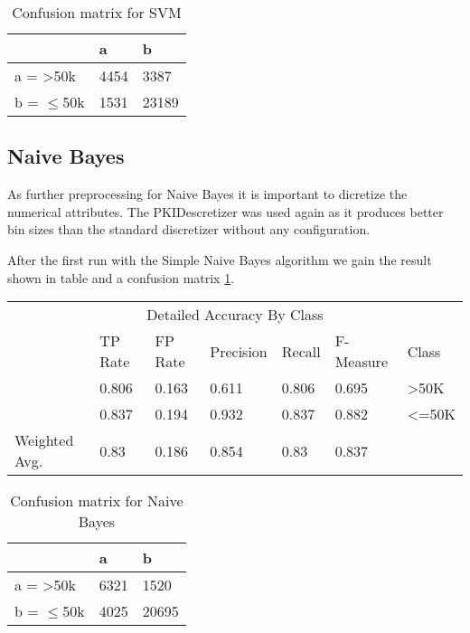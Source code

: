 \documentclass[paper=a4, fontsize=11pt]{scrartcl} %
\numberwithin{equation}{section} %
\numberwithin{figure}{section} %
\numberwithin{table}{section} %
\begin{document}
\vspace{6pt}

\begin{table}[h]
\centering
\begin{tabular}{|l|ll|}
\hline
              &    a &     b \\
\hline
 a = >50k      & 4454 &  3387 \\
 b = $\leq$50k & 1531 & 23189\\
\hline
\end{tabular}
\caption{Confusion matrix for SVM}
\end{table}


\subsection{Naive Bayes}





As further preprocessing for Naive Bayes it is important to dicretize the numerical attributes. The PKIDescretizer was used again as it produces better bin sizes than the standard discretizer without any configuration.

After the first run with the Simple Naive Bayes algorithm we gain the result shown in table \label{tab:adult:bayes:1d} and a confusion matrix \ref{tab:adult:bayes:1c}.

\begin{table*}[htb]\centering
  \begin{tabular*}{\columnwidth}{@{}lllllll@{}}
      \toprule 
      \multicolumn{7}{c}{Detailed Accuracy By Class} \\ 
               &  TP Rate & FP Rate & Precision & Recall & F-Measure & Class \\   \midrule
               &  0.806   & 0.163   & 0.611     & 0.806  & 0.695     & >50K  \\
               &  0.837   & 0.194   & 0.932     & 0.837  & 0.882     & <=50K \\
Weighted Avg.  &  0.83    & 0.186   & 0.854     & 0.83   & 0.837     &       \\   \bottomrule
    \end{tabular*}
\caption{Naive Bayes -- preprocessed with PKIDiscretizer} 
\label{tab:adult:bayes:1d}
\end{table*}



\begin{table}[h]
\centering
\begin{tabular}{|l|ll|}
\hline
              &    a &     b \\
\hline
 a = >50k      & 6321 &1520   \\
 b = $\leq$50k & 4025 &20695 \\
\hline
\end{tabular}
\caption{Confusion matrix for Naive Bayes}
\label{tab:adult:bayes:1c}
\end{table}
\end{document}
